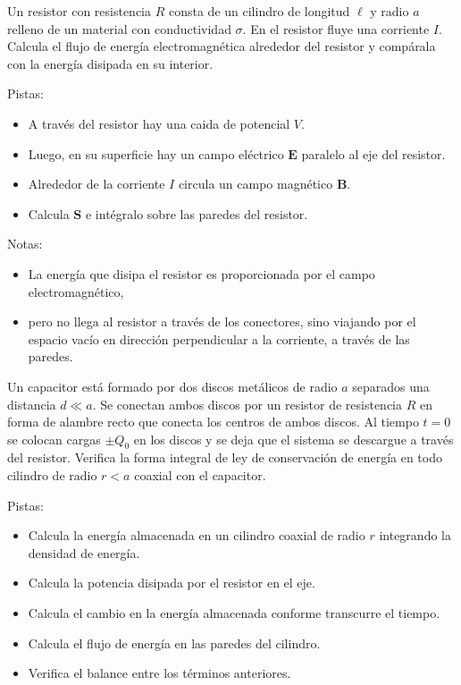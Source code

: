 \documentclass{exam}
\begin{document}
\begin{questions}
\question\label{16} Un resistor con resistencia $R$ consta de un
  cilindro de longitud $\ell$ y radio $a$ relleno de un material con
  conductividad $\sigma$. En el resistor fluye una corriente
  $I$. Calcula el flujo de energía electromagnética alrededor del
  resistor y compárala con la energía disipada en su interior.

  Pistas:
  \begin{itemize}
  \item A través del resistor hay una caida de potencial $V$.
  \item Luego, en su superficie hay un campo eléctrico $\bm E$
    paralelo al eje del resistor.
  \item Alrededor de la corriente $I$ circula un campo magnético $\bm
    B$.
  \item Calcula $\bm S$ e intégralo sobre las paredes del resistor.
  \end{itemize}
  Notas:
  \begin{itemize}
  \item La energía que disipa el resistor es proporcionada por el
    campo electromagnético,
  \item pero no llega al resistor a través de los conectores, sino
    viajando por el espacio vacío en dirección perpendicular a la corriente, a través de
    las paredes.
  \end{itemize}

\question\label{17} Un capacitor está formado por dos discos metálicos
  de radio $a$ separados una distancia $d\ll a$. Se conectan ambos
  discos por un resistor de resistencia $R$ en forma de alambre recto
  que conecta los centros de ambos discos. Al tiempo $t=0$ se colocan
  cargas $\pm Q_0$ en los discos y se deja que el sistema se descargue
  a través del resistor.  Verifica la forma integral de ley de
  conservación de energía en todo cilindro de radio $r<a$ coaxial con
  el capacitor.

  Pistas:
  \begin{itemize}
  \item Calcula la energía almacenada en un cilindro coaxial de radio
    $r$ integrando la densidad de energía.
  \item Calcula la potencia disipada por el resistor en el eje.
  \item Calcula el cambio en la energía almacenada conforme transcurre
    el tiempo.
  \item Calcula el flujo de energía en las paredes del cilindro.
  \item Verifica el balance entre los términos anteriores.
  \end{itemize}


\end{questions}
\end{document}
